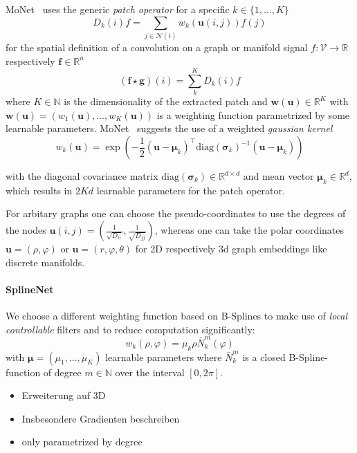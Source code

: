 \documentclass[pdftex,10pt,a4paper]{scrartcl}
\begin{document}
MoNet~\cite{Monti2016} uses the generic \emph{patch operator} for a specific $k \in \{ 1, \ldots, K \}$
\begin{equation*}
  D_k(i)f = \sum_{j \in \mathcal{N}(i)} w_k(\mathbf{u}(i, j)) f(j)
\end{equation*}
for the spatial definition of a convolution on a graph or manifold signal $f \colon \mathcal{V} \to \mathbb{R}$ respectively $\mathbf{f} \in \mathbb{R}^n$
\begin{equation*}
  (\mathbf{f} \star \mathbf{g})(i) = \sum_k^K D_k(i)f
\end{equation*}
where $K \in \mathbb{N}$ is the dimensionality of the extracted patch and $\mathbf{w}(\mathbf{u}) \in \mathbb{R}^K$ with $\mathbf{w}(\mathbf{u}) = (w_1(\mathbf{u}), \ldots, w_K(\mathbf{u}))$ is a weighting function parametrized by some learnable parameters.
MoNet~\cite{Monti2016} suggests the use of a weighted \emph{gaussian kernel}
\begin{equation*}
  w_k(\mathbf{u}) = \exp \left(-\frac{1}{2} {(\mathbf{u} - \boldsymbol{\mu}_k)}^{\top} {\mathrm{diag}(\boldsymbol{\sigma}_k)}^{-1} (\mathbf{u} - \boldsymbol{\mu}_k) \right)
\end{equation*}

with the diagonal covariance matrix $\mathrm{diag}(\boldsymbol{\sigma}_k) \in \mathbb{R}^{d \times d}$ and mean vector $\boldsymbol{\mu}_k \in \mathbb{R}^d$, which results in $2Kd$ learnable parameters for the patch operator.

For arbitary graphs one can choose the pseudo-coordinates to use the degrees of the nodes $\mathbf{u}(i,j) = \left( \tfrac{1}{\sqrt{D_{ii}}}, \tfrac{1}{\sqrt{D_{jj}}} \right)$, whereas one can take the polar coordinates $\mathbf{u} = (\rho, \varphi)$ or $\mathbf{u} = (r, \varphi, \theta)$ for 2D respectively 3d graph embeddings like discrete manifolds.

\paragraph{SplineNet}

We choose a different weighting function based on B-Splines to make use of \emph{local controllable} filters and to reduce computation significantly:
\begin{equation*}
  w_k(\rho, \varphi) = \mu_k \rho \bar{N}_k^m(\varphi)
\end{equation*}
with $\boldsymbol{\mu} = (\mu_1, \ldots, \mu_K )$ learnable parameters where $\bar{N}_k^m$ is a closed B-Spline-function of degree $m \in \mathbb{N}$ over the interval $[0, 2\pi]$.






\begin{itemize}
  \item Erweiterung auf 3D
  \item Insbesondere Gradienten beschreiben
\end{itemize}

\begin{itemize}
  \item only parametrized by degree
\end{itemize}



\end{document}

